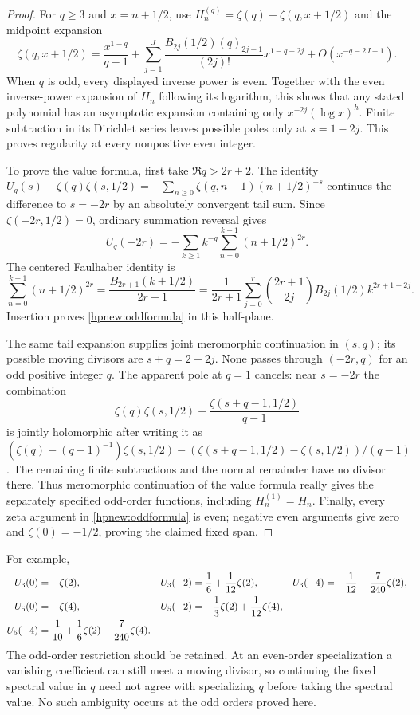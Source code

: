\documentclass[11pt,a4paper]{article}
\numberwithin{equation}{section}
\theoremstyle{definition}
\theoremstyle{remark}
\begin{document}
\begin{proof}
For $q\ge3$ and $x=n+1/2$, use
$H_n^{(q)}=\zeta(q)-\zeta(q,x+1/2)$ and the midpoint expansion
\[
 \zeta(q,x+1/2)=\frac{x^{1-q}}{q-1}
 +\sum_{j=1}^{J}\frac{B_{2j}(1/2)(q)_{2j-1}}{(2j)!}
                                       x^{1-q-2j}
 +O(x^{-q-2J-1}).
\]
When $q$ is odd, every displayed inverse power is even. Together
with the even inverse-power expansion of $H_n$ following its
logarithm, this shows that any stated polynomial has an asymptotic
expansion containing only $x^{-2j}(\log x)^h$. Finite subtraction
in its Dirichlet series leaves possible poles only at $s=1-2j$.
This proves regularity at every nonpositive even integer.

To prove the value formula, first take $\Re q>2r+2$. The identity
$U_q(s)-\zeta(q)\zeta(s,1/2)
=-\sum_{n\ge0}\zeta(q,n+1)(n+1/2)^{-s}$ continues the difference
to $s=-2r$ by an absolutely convergent tail sum. Since
$\zeta(-2r,1/2)=0$, ordinary summation reversal gives
\[
 U_q(-2r)=-\sum_{k\ge1}k^{-q}
                         \sum_{n=0}^{k-1}(n+1/2)^{2r}.
\]
The centered Faulhaber identity is
\[
 \sum_{n=0}^{k-1}(n+1/2)^{2r}
 =\frac{B_{2r+1}(k+1/2)}{2r+1}
 =\frac1{2r+1}\sum_{j=0}^{r}\binom{2r+1}{2j}
                              B_{2j}(1/2)k^{2r+1-2j}.
\]
Insertion proves \eqref{hpnew:oddformula} in this half-plane.

The same tail expansion supplies joint meromorphic continuation
in $(s,q)$; its possible moving divisors are $s+q=2-2j$.
None passes through $(-2r,q)$ for an odd positive integer $q$.
The apparent pole at $q=1$ cancels: near $s=-2r$ the combination
\[
 \zeta(q)\zeta(s,1/2)-\frac{\zeta(s+q-1,1/2)}{q-1}
\]
is jointly holomorphic after writing it as
$(\zeta(q)-(q-1)^{-1})\zeta(s,1/2)
-(\zeta(s+q-1,1/2)-\zeta(s,1/2))/(q-1)$.
The remaining finite subtractions and the normal remainder have
no divisor there. Thus meromorphic continuation of the value formula
really gives the separately specified odd-order functions, including
$H_n^{(1)}=H_n$. Finally, every zeta argument in
\eqref{hpnew:oddformula} is even; negative even arguments give zero
and $\zeta(0)=-1/2$, proving the claimed fixed span.
\end{proof}

For example,
\begin{align}\label{hpnew:thirdorder}
 U_3(0)&=-\zeta(2),&
 U_3(-2)&=\frac16+\frac1{12}\zeta(2),&
 U_3(-4)&=-\frac1{12}-\frac7{240}\zeta(2),\\
 U_5(0)&=-\zeta(4),&
 U_5(-2)&=-\frac13\zeta(2)+\frac1{12}\zeta(4),\notag\\
 U_5(-4)&=\frac1{10}+\frac16\zeta(2)-\frac7{240}\zeta(4).
                                                               \notag
\end{align}
The odd-order restriction should be retained. At an even-order
specialization a vanishing coefficient can still meet a moving divisor,
so continuing the fixed spectral value in $q$ need not agree with
specializing $q$ before taking the spectral value. No such ambiguity
occurs at the odd orders proved here.
\end{document}
